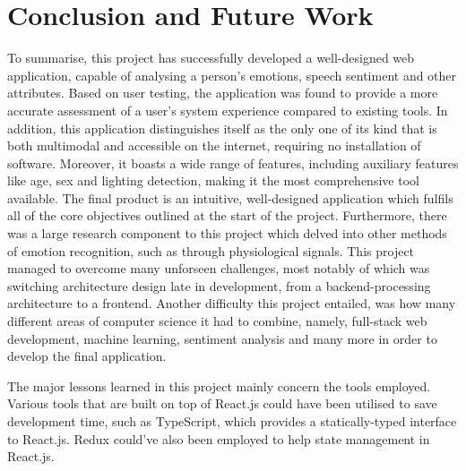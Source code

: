 \documentclass[12pt, a4paper]{article}
\newcommand{\np}
    {
    \vskip 0.4cm
    }
\begin{document}



\section{Conclusion and Future Work}




To summarise, this project has successfully developed a well-designed web application, capable of analysing a person's emotions, speech sentiment and other attributes. Based on user testing, the application was found to provide a more accurate assessment of a user's system experience compared to existing tools. In addition, this application distinguishes itself as the only one of its kind that is both multimodal and accessible on the internet, requiring no installation of software. Moreover, it boasts a wide range of features, including auxiliary features like age, sex and lighting detection, making it the most comprehensive tool available. The final product is an intuitive, well-designed application which fulfils all of the core objectives outlined at the start of the project. Furthermore, there was a large research component to this project which delved into other methods of emotion recognition, such as through physiological signals. This project managed to overcome many unforseen challenges, most notably of which was switching architecture design late in development, from a backend-processing architecture to a frontend. Another difficulty this project entailed, was how many different areas of computer science it had to combine, namely, full-stack web development, machine learning, sentiment analysis and many more in order to develop the final application.
\np
The major lessons learned in this project mainly concern the tools employed. Various tools that are built on top of React.js could have been utilised to save development time, such as TypeScript, which provides a statically-typed interface to React.js. Redux could've also been employed to help state management in React.js.
\end{document}
